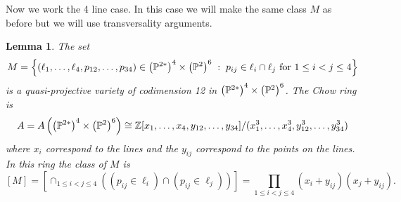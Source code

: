 \documentclass[12pt]{article}
\theoremstyle{plain}
\newtheorem{lemma}[theorem]{Lemma}
\theoremstyle{definition}
\newcommand{\Z}{\mathbb{Z}}
\renewcommand{\P}{\ensuremath \mathbb{P}}
\begin{document}
Now we work the 4 line case. In this case we will make the same class $M$ as before but we will use transversality arguments.

\begin{lemma}\label{4linesM}
The set
$$ M = \left\{(\ell_1,\dots,\ell_4,p_{12},\dots,p_{34}) \in 
\left( \P^{2*}\right)^{4}\times \left( \P^{2}\right)^{6} \; : \; p_{ij} \in
\ell_i \cap \ell_j  \text{ for $1 \leq i < j \leq 4$} \right\}$$ 
is a quasi-projective variety of codimension 12 in $\left( \P^{2*}\right)^{4}\times \left( \P^{2}\right)^{6}$. The Chow ring is $$A=A\left(\left( \P^{2*}\right)^{4}\times \left( \P^{2}\right)^{6}\right) \cong \Z[x_1,\dots, x_4,y_{12},\dots , y_{34}]/(x_1^3,\dots,x_4^3,y_{12}^3,\dots,y_{34}^3)$$ where $x_i$ correspond to the lines and the $y_{ij}$ correspond to the points on the lines. In this ring the class of $M$ is $$[M]=\left[\cap_{1 \leq i < j \leq 4} \left( (p_{ij} \in \ell_i) \cap (p_{ij}
\in \ell_j)\right)\right] = \prod_{1 \leq i < j \leq 4} (x_i 
+ y_{ij})(x_j + y_{ij}) .$$

\end{lemma}
\end{document}
